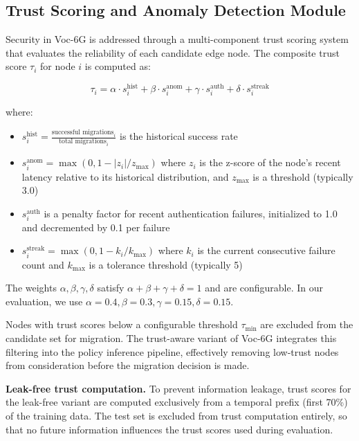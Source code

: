 \documentclass[10pt,letterpaper]{article}
\providecommand{\VocSixG}{Voc-6G}
\begin{document}
\subsection*{Trust Scoring and Anomaly Detection Module}
\label{sec:trust}

Security in \VocSixG{} is addressed through a multi-component trust scoring system that evaluates the reliability of each candidate edge node. The composite trust score $\tau_i$ for node $i$ is computed as:

\begin{equation}
\tau_i = \alpha \cdot s_i^{\text{hist}} + \beta \cdot s_i^{\text{anom}} + \gamma \cdot s_i^{\text{auth}} + \delta \cdot s_i^{\text{streak}}
\label{eq:trust}
\end{equation}

where:
\begin{itemize}
    \item $s_i^{\text{hist}} = \frac{\text{successful migrations}_i}{\text{total migrations}_i}$ is the historical success rate
    \item $s_i^{\text{anom}} = \max(0, 1 - |z_i| / z_{\max})$ where $z_i$ is the z-score of the node's recent latency relative to its historical distribution, and $z_{\max}$ is a threshold (typically 3.0)
    \item $s_i^{\text{auth}}$ is a penalty factor for recent authentication failures, initialized to 1.0 and decremented by 0.1 per failure
    \item $s_i^{\text{streak}} = \max(0, 1 - k_i / k_{\max})$ where $k_i$ is the current consecutive failure count and $k_{\max}$ is a tolerance threshold (typically 5)
\end{itemize}

The weights $\alpha, \beta, \gamma, \delta$ satisfy $\alpha + \beta + \gamma + \delta = 1$ and are configurable. In our evaluation, we use $\alpha=0.4, \beta=0.3, \gamma=0.15, \delta=0.15$.

Nodes with trust scores below a configurable threshold $\tau_{\min}$ are excluded from the candidate set for migration. The trust-aware variant of \VocSixG{} integrates this filtering into the policy inference pipeline, effectively removing low-trust nodes from consideration before the migration decision is made.

\textbf{Leak-free trust computation.} To prevent information leakage, trust scores for the leak-free variant are computed exclusively from a temporal prefix (first 70\%) of the training data. The test set is excluded from trust computation entirely, so that no future information influences the trust scores used during evaluation.
\end{document}
